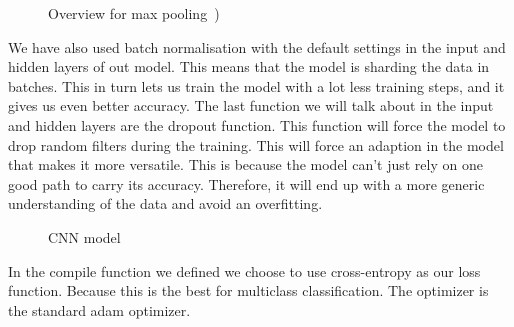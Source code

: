 \begin{figure}[h]
    \caption{Overview for max pooling~\cite{CNN})}
    \label{fig:Max pooling}
\end{figure}

We have also used batch normalisation with the default settings in the input and hidden layers of out model.
This means that the model is sharding the data in batches.
This in turn lets us train the model with a lot less training steps, and it gives us even better accuracy.
The last function we will talk about in the input and hidden layers are the dropout function.
This function will force the model to drop random filters during the training.
This will force an adaption in the model that makes it more versatile.
This is because the model can't just rely on one good path to carry its accuracy.
Therefore, it will end up with a more generic understanding of the data and avoid an overfitting.

\begin{figure}[h]
    \caption{CNN model}
    \label{fig:CNN model}
\end{figure}

In the compile function we defined we choose to use cross-entropy as our loss function.
Because this is the best for multiclass classification.
The optimizer is the standard adam optimizer.

